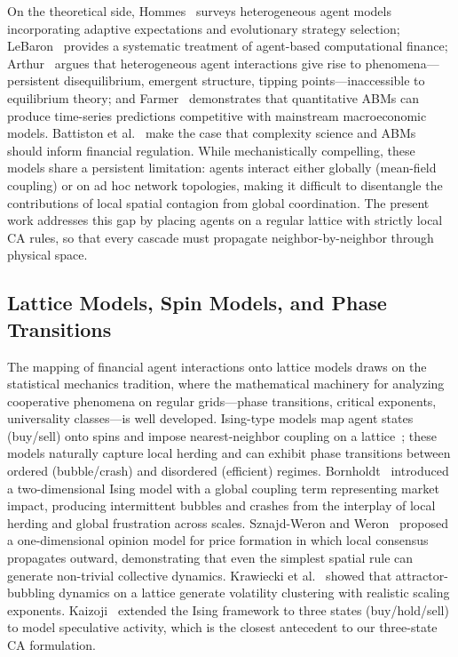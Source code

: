 \documentclass{article}
\theoremstyle{definition}
\theoremstyle{remark}
\begin{document}
On the theoretical side, Hommes~\cite{hommes2006heterogeneous} surveys heterogeneous agent
models incorporating adaptive expectations and evolutionary strategy selection;
LeBaron~\cite{lebaron2006agent} provides a systematic treatment of agent-based computational
finance; Arthur~\cite{arthur2021complexity} argues that heterogeneous agent interactions give
rise to phenomena---persistent disequilibrium, emergent structure, tipping
points---inaccessible to equilibrium theory; and Farmer~\cite{farmer2025quantitative}
demonstrates that quantitative ABMs can produce time-series predictions competitive with
mainstream macroeconomic models. Battiston et al.~\cite{battiston2016complexity} make the
case that complexity science and ABMs should inform financial regulation. While mechanistically
compelling, these models share a persistent limitation: agents interact either globally
(mean-field coupling) or on ad hoc network topologies, making it difficult to disentangle the
contributions of local spatial contagion from global coordination. The present work addresses
this gap by placing agents on a regular lattice with strictly local CA rules, so that every
cascade must propagate neighbor-by-neighbor through physical space.

\subsection{Lattice Models, Spin Models, and Phase Transitions}
The mapping of financial agent interactions onto lattice models draws on the statistical
mechanics tradition, where the mathematical machinery for analyzing cooperative phenomena on
regular grids---phase transitions, critical exponents, universality classes---is well
developed. Ising-type models map agent states (buy/sell) onto spins and impose
nearest-neighbor coupling on a
lattice~\cite{stauffer2000generalization,chowdhury2000statistical}; these models naturally
capture local herding and can exhibit phase transitions between ordered (bubble/crash) and
disordered (efficient) regimes. Bornholdt~\cite{bornholdt2001ising} introduced a
two-dimensional Ising model with a global coupling term representing market impact, producing
intermittent bubbles and crashes from the interplay of local herding and global frustration
across scales. Sznajd-Weron and Weron~\cite{sznajd2002simple} proposed a one-dimensional
opinion model for price formation in which local consensus propagates outward, demonstrating
that even the simplest spatial rule can generate non-trivial collective dynamics. Krawiecki
et al.~\cite{krawiecki2002volatility} showed that attractor-bubbling dynamics on a lattice
generate volatility clustering with realistic scaling exponents. Kaizoji~\cite{kaizoji2002speculative}
extended the Ising framework to three states (buy/hold/sell) to model speculative activity,
which is the closest antecedent to our three-state CA formulation.
\end{document}

